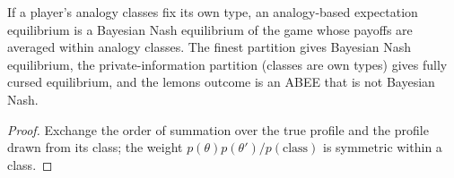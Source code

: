 \begin{theorem}
\label{thm:beh-abee}
\leanok
{}
If a player's analogy classes fix its own type, an analogy-based expectation equilibrium is a Bayesian Nash
equilibrium of the game whose payoffs are averaged within analogy classes. The finest partition gives Bayesian Nash
equilibrium, the private-information partition (classes are own types) gives fully cursed equilibrium, and the lemons outcome is an ABEE that is
not Bayesian Nash.
\end{theorem}
\begin{proof}
\leanok
Exchange the order of summation over the true profile and the profile drawn from its class; the weight
$p(\theta)p(\theta')/p(\text{class})$ is symmetric within a class.
\end{proof}

